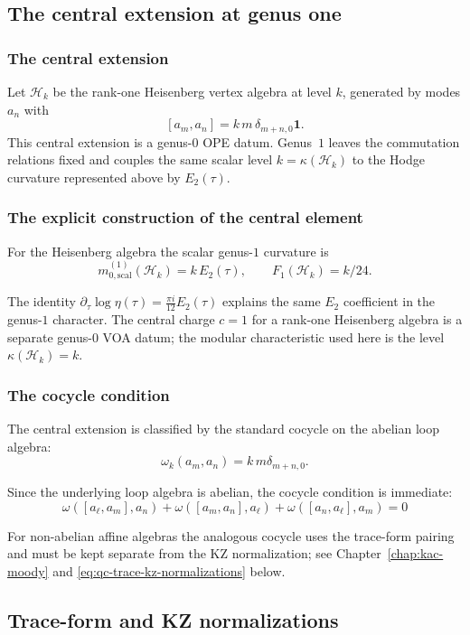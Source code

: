 \subsection{The central extension at genus one}

\subsubsection{The central extension}

Let $\mathcal H_k$ be the rank-one Heisenberg vertex algebra at level
$k$, generated by modes $a_n$ with
\[
[a_m,a_n]=k\,m\,\delta_{m+n,0}\mathbf 1 .
\]
This central extension is a genus-$0$ OPE datum.  Genus~$1$ leaves
the commutation relations fixed and couples the same scalar level
$k=\kappa(\mathcal H_k)$ to the Hodge curvature represented above by
$E_2(\tau)$.

\subsubsection{The explicit construction of the central element}

For the Heisenberg algebra the scalar genus-$1$ curvature is
\[
m_{0,\mathrm{scal}}^{(1)}(\mathcal H_k)=k\,E_2(\tau),
\qquad
F_1(\mathcal H_k)=k/24 .
\]

The identity
$\partial_\tau\log\eta(\tau)=\frac{\pi i}{12}E_2(\tau)$ explains the
same $E_2$ coefficient in the genus-$1$ character.  The central charge
$c=1$ for a rank-one Heisenberg algebra is a separate genus-$0$ VOA
datum; the modular characteristic used here is the level
$\kappa(\mathcal H_k)=k$.

\subsubsection{The cocycle condition}

The central extension is classified by the standard cocycle on the
abelian loop algebra:
\[
\omega_k(a_m,a_n)=k\,m\delta_{m+n,0}.
\]

Since the underlying loop algebra is abelian, the cocycle condition is
immediate:
\[\omega([a_\ell, a_m], a_n) + \omega([a_m, a_n], a_\ell) + \omega([a_n, a_\ell], a_m) = 0\]

For non-abelian affine algebras the analogous cocycle uses the
trace-form pairing and must be kept separate from the KZ normalization;
see Chapter~\ref{chap:kac-moody} and
\eqref{eq:qc-trace-kz-normalizations} below.

\subsection{Trace-form and KZ normalizations}

